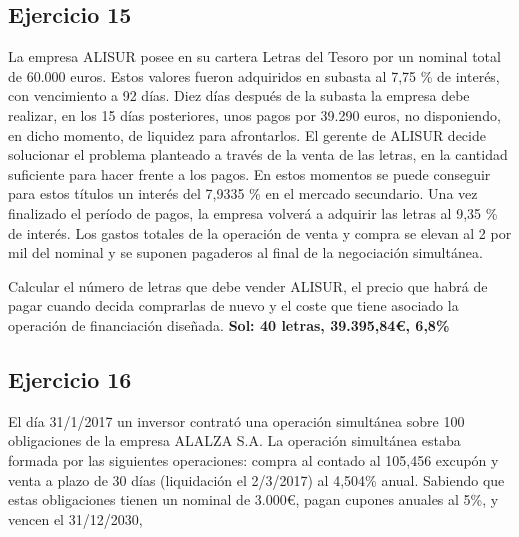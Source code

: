 \subsection*{Ejercicio 15}

La empresa ALISUR posee en su cartera Letras del Tesoro por un nominal total de 60.000 euros. Estos valores fueron adquiridos en subasta al 7,75 \% de interés, con vencimiento a 92 días. Diez días después de la subasta la empresa debe realizar, en los 15 días posteriores, unos pagos por 39.290 euros, no disponiendo, en dicho momento, de liquidez para afrontarlos. El gerente de ALISUR decide solucionar el problema planteado a través de la venta de las letras, en la cantidad suficiente para hacer frente a los pagos. En estos momentos se puede conseguir para estos títulos un interés del 7,9335 \% en el mercado secundario. Una vez finalizado el período de pagos, la empresa volverá a adquirir las letras al 9,35 \% de interés. Los gastos totales de la operación de venta y compra se elevan al 2 por mil del nominal y se suponen pagaderos al final de la negociación simultánea.

Calcular el número de letras que debe vender ALISUR, el precio que habrá de pagar cuando decida comprarlas de nuevo y el coste que tiene asociado la operación de financiación diseñada. \textbf{Sol: 40 letras, 39.395,84€, 6,8\%}

\subsection*{Ejercicio 16}

El día 31/1/2017 un inversor contrató una operación simultánea sobre 100 obligaciones de la empresa ALALZA S.A. La operación simultánea estaba formada por las siguientes operaciones: compra al contado al 105,456 excupón y venta a plazo de 30 días (liquidación el 2/3/2017) al 4,504\% anual. Sabiendo que estas obligaciones tienen un nominal de 3.000€, pagan cupones anuales al 5\%, y vencen el 31/12/2030,

